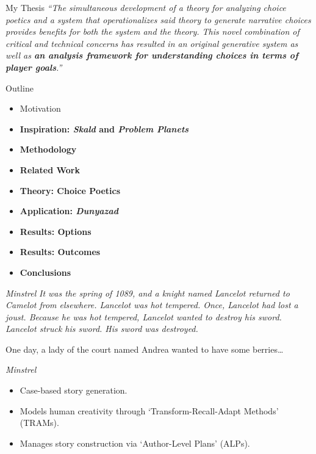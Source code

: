 \documentclass[xcolor=x11names]{beamer}
\def\dunyazad/{\textit{Dunyazad}}
\def\minstrel/{\textit{Minstrel}}
\def\skald/{\textit{Skald}}
\def\problemplanets/{\textit{Problem Planets}}
\begin{document}
\begin{frame}{My Thesis}
  \justifying
  \itshape
  ``The simultaneous development of a theory for analyzing choice poetics and a system that operationalizes said theory to generate narrative choices provides benefits for both the system and the theory. This novel combination of critical and technical concerns has resulted in an original generative system as well as \textbf{an analysis framework for understanding choices in terms of player goals}.''
\end{frame}

\begin{frame}{Outline}
  \begin{itemize}
    \item Motivation
    \item \textbf{Inspiration: \skald/ and \problemplanets/}
    \item \textbf{Methodology}
    \item \textbf{Related Work}
    \item \textbf{Theory: Choice Poetics}
    \item \textbf{Application: \dunyazad/}
    \item \textbf{Results: Options}
    \item \textbf{Results: Outcomes}
    \item \textbf{Conclusions}
  \end{itemize}
\end{frame}

\begin{frame}{\minstrel/}
  \justifying
  \setlength{\parindent}{1.5em}
  \itshape
  It was the spring of 1089, and a knight named Lancelot returned to Camelot from elsewhere. Lancelot was hot tempered. Once, Lancelot had lost a joust. Because he was hot tempered, Lancelot wanted to destroy his sword. Lancelot struck his sword. His sword was destroyed.

  One day, a lady of the court named Andrea wanted to have some berries\ldots
\end{frame}

\begin{frame}{\minstrel/}
  \vfill
  \begin{itemize}\addtolength{\itemsep}{0.5\baselineskip}
    \item Case-based story generation.
    \item Models human creativity through `Transform-Recall-Adapt Methods' (TRAMs).
    \item Manages story construction via `Author-Level Plans' (ALPs).
  \end{itemize}
  \vfill
  \centering
  \tiny
\end{frame}
\end{document}
